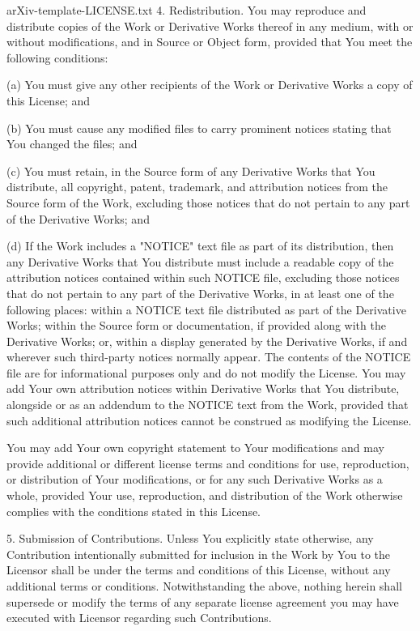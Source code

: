 \begin{filecontents*}{arXiv-template-LICENSE.txt}
   4. Redistribution. You may reproduce and distribute copies of the
      Work or Derivative Works thereof in any medium, with or without
      modifications, and in Source or Object form, provided that You
      meet the following conditions:

      (a) You must give any other recipients of the Work or
          Derivative Works a copy of this License; and

      (b) You must cause any modified files to carry prominent notices
          stating that You changed the files; and

      (c) You must retain, in the Source form of any Derivative Works
          that You distribute, all copyright, patent, trademark, and
          attribution notices from the Source form of the Work,
          excluding those notices that do not pertain to any part of
          the Derivative Works; and

      (d) If the Work includes a "NOTICE" text file as part of its
          distribution, then any Derivative Works that You distribute must
          include a readable copy of the attribution notices contained
          within such NOTICE file, excluding those notices that do not
          pertain to any part of the Derivative Works, in at least one
          of the following places: within a NOTICE text file distributed
          as part of the Derivative Works; within the Source form or
          documentation, if provided along with the Derivative Works; or,
          within a display generated by the Derivative Works, if and
          wherever such third-party notices normally appear. The contents
          of the NOTICE file are for informational purposes only and
          do not modify the License. You may add Your own attribution
          notices within Derivative Works that You distribute, alongside
          or as an addendum to the NOTICE text from the Work, provided
          that such additional attribution notices cannot be construed
          as modifying the License.

      You may add Your own copyright statement to Your modifications and
      may provide additional or different license terms and conditions
      for use, reproduction, or distribution of Your modifications, or
      for any such Derivative Works as a whole, provided Your use,
      reproduction, and distribution of the Work otherwise complies with
      the conditions stated in this License.

   5. Submission of Contributions. Unless You explicitly state otherwise,
      any Contribution intentionally submitted for inclusion in the Work
      by You to the Licensor shall be under the terms and conditions of
      this License, without any additional terms or conditions.
      Notwithstanding the above, nothing herein shall supersede or modify
      the terms of any separate license agreement you may have executed
      with Licensor regarding such Contributions.


\end{filecontents*}
